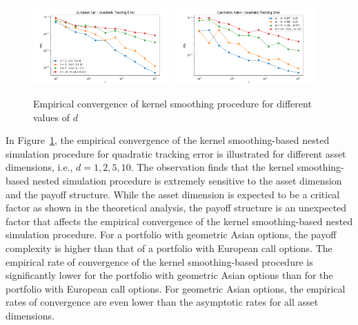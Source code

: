 \begin{figure}[ht!]
    \centering
    \includegraphics[width=0.48\textwidth]{./project1/figures/figure4a.png}
    \includegraphics[width=0.48\textwidth]{./project1/figures/figure4b.png}
    \caption{Empirical convergence of kernel smoothing procedure for different values of $d$}
    \label{fig1:kernel_d} 
\end{figure}

In Figure~\ref{fig1:kernel_d}, the empirical convergence of the kernel smoothing-based nested simulation procedure for quadratic tracking error is illustrated for different asset dimensions, i.e., $d = 1, 2, 5, 10$.
The observation finds that the kernel smoothing-based nested simulation procedure is extremely sensitive to the asset dimension and the payoff structure.
While the asset dimension is expected to be a critical factor as shown in the theoretical analysis, the payoff structure is an unexpected factor that affects the empirical convergence of the kernel smoothing-based nested simulation procedure.
For a portfolio with geometric Asian options, the payoff complexity is higher than that of a portfolio with European call options.
The empirical rate of convergence of the kernel smoothing-based procedure is significantly lower for the portfolio with geometric Asian options than for the portfolio with European call options.
For geometric Asian options, the empirical rates of convergence are even lower than the asymptotic rates for all asset dimensions.

